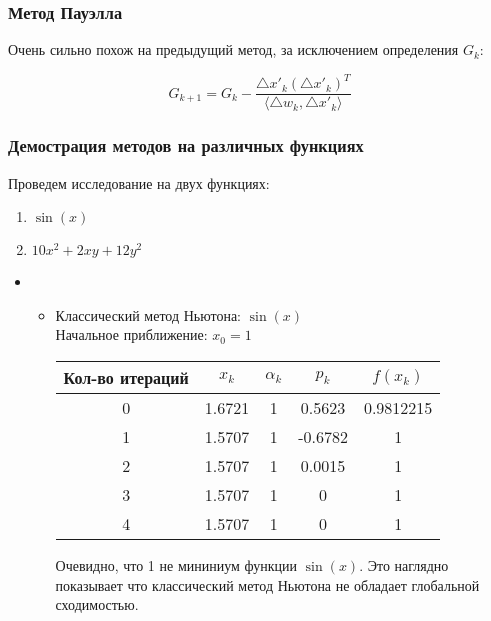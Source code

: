 \documentclass[a4paper, 14pt]{article}
\begin{document}
\subsubsection*{Метод Пауэлла}
Очень сильно похож на предыдущий метод, за исключением определения $G_k$:

\[G_{k + 1} = G_k - \frac{\triangle x'_k (\triangle x'_k)^T}{\langle \triangle w_k, \triangle x'_k \rangle} \] 


\subsubsection*{Демострация методов на различных функциях}
	Проведем исследование на двух функциях:
	\begin{enumerate}
	\item 	 $\sin(x)$ 
	\item  $10x^2 + 2xy + 12y^2$ 
\end{enumerate}
\begin{itemize}
\item 
	\begin{itemize}
		\item Классический метод Ньютона: $\sin(x)$\\
		Начальное приближение: $x_0 = 1$\\
		\begin{tabular}{  |c | c | c| c| c|}
\hline
Кол-во итераций & $x_k$ & $\alpha_k$ & $p_k$  & $f(x_k)$\\ \hline
0 & 1.6721 & 1 & 0.5623 & 0.9812215 \\
1 & 1.5707  & 1& -0.6782 & 1\\
2 & 1.5707 & 1 & 0.0015 & 1 \\
3 & 1.5707 & 1 & 0 & 1 \\
4 & 1.5707 & 1 & 0 & 1 \\
\hline
\end{tabular}

Очевидно, что 1 не мининиум функции $\sin(x)$. Это наглядно показывает что классический метод Ньютона не обладает глобальной сходимостью.
		
	\end{itemize}
\end{itemize}


 
\end{document}
